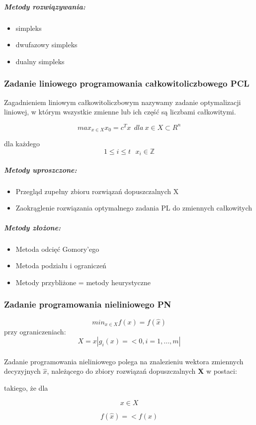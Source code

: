 \documentclass[a4paper,twoside]{report}
\begin{document}
\subparagraph{Metody rozwiązywania:}
\begin{itemize}
\item simpleks
\item dwufazowy simpleks
\item dualny simpleks
\end{itemize} 
 
\subsubsection{Zadanie liniowego programowania całkowitoliczbowego PCL}

Zagadnieniem liniowym całkowitoliczbowym nazywamy zadanie optymalizacji
liniowej, w którym wszystkie zmienne lub ich część są liczbami całkowitymi.

\[max_{x \in X} x_0 = c^Tx~~dla~x \in X \subset R^n\]


dla każdego $$1 \le i \le t~~~x_i \in \mathbb{Z}$$

\subparagraph{Metody uproszczone:}
\begin{itemize}
\item Przegląd zupełny zbioru rozwiązań dopuszczalnych X
\item Zaokrąglenie rozwiązania optymalnego zadania PL do zmiennych całkowitych
\end{itemize}

\subparagraph{Metody złożone:}
\begin{itemize}
\item Metoda odcięć Gomory'ego
\item Metoda podziału i ograniczeń
\item Metody przybliżone = metody heurystyczne
\end{itemize}


\subsubsection{Zadanie programowania nieliniowego PN}

$$min_{x \in X} f(x) = f(\hat{x})$$
przy ograniczeniach:
$$X={x|g_i(x)=<0, i=1,...,m|}$$ 
\\
Zadanie programowania nieliniowego polega na znalezieniu wektora zmiennych decyzyjnych $\hat{x}$, należącego do zbiory rozwiązań dopuszczalnych \textbf{X} w postaci: 

takiego, że dla

$$x \in X$$

$$f(\hat{x})=<f(x)$$
\end{document}

